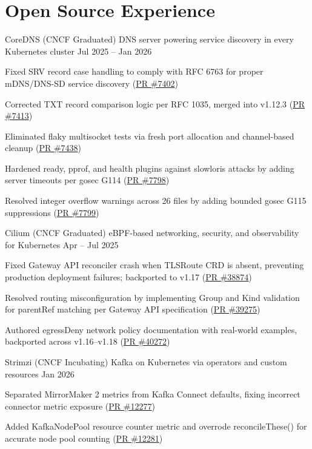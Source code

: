 
\section{Open Source Experience}

\ossproject
{CoreDNS (CNCF Graduated)}
{DNS server powering service discovery in every Kubernetes cluster}
{Jul 2025 -- Jan 2026}
{
\item Fixed SRV record case handling to comply with RFC 6763 for proper mDNS/DNS-SD
      service discovery (\href{https://github.com/coredns/coredns/pull/7402}{PR \#7402})
\item Corrected TXT record comparison logic per RFC 1035, merged into v1.12.3
      (\href{https://github.com/coredns/coredns/pull/7413}{PR \#7413})
\item Eliminated flaky multisocket tests via fresh port allocation and channel-based
      cleanup (\href{https://github.com/coredns/coredns/pull/7438}{PR \#7438})
\item Hardened ready, pprof, and health plugins against slowloris attacks by adding
      server timeouts per gosec G114 (\href{https://github.com/coredns/coredns/pull/7798}{PR \#7798})
\item Resolved integer overflow warnings across 26 files by adding bounded gosec G115
      suppressions (\href{https://github.com/coredns/coredns/pull/7799}{PR \#7799})
}

\ossproject
{Cilium (CNCF Graduated)}
{eBPF-based networking, security, and observability for Kubernetes}
{Apr -- Jul 2025}
{
\item Fixed Gateway API reconciler crash when TLSRoute CRD is absent, preventing
      production deployment failures; backported to v1.17 (\href{https://github.com/cilium/cilium/pull/38874}{PR \#38874})
\item Resolved routing misconfiguration by implementing Group and Kind validation
      for parentRef matching per Gateway API specification (\href{https://github.com/cilium/cilium/pull/39275}{PR \#39275})
\item Authored egressDeny network policy documentation with real-world examples,
      backported across v1.16--v1.18 (\href{https://github.com/cilium/cilium/pull/40272}{PR \#40272})
}

\ossproject
{Strimzi (CNCF Incubating)}
{Kafka on Kubernetes via operators and custom resources}
{Jan 2026}
{
\item Separated MirrorMaker 2 metrics from Kafka Connect defaults, fixing incorrect
      connector metric exposure (\href{https://github.com/strimzi/strimzi-kafka-operator/pull/12277}{PR \#12277})
\item Added KafkaNodePool resource counter metric and overrode reconcileThese() for
      accurate node pool counting (\href{https://github.com/strimzi/strimzi-kafka-operator/pull/12281}{PR \#12281})
}

